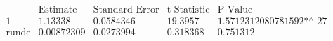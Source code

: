 \[\begin{array}{l|llll}
 \text{} & \text{Estimate} & \text{Standard Error} & \text{t-Statistic} & \text{P-Value} \\
\hline
 1 & 1.13338 & 0.0584346 & 19.3957 & \text{1.5712312080781592$\grave{ }$*${}^{\wedge}$-27} \\
 \text{runde} & 0.00872309 & 0.0273994 & 0.318368 & 0.751312 \\
\end{array}\]

